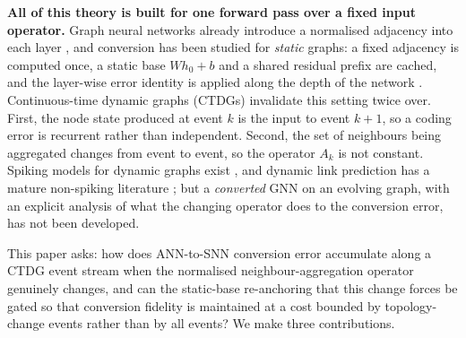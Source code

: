 \documentclass[preprint,12pt]{elsarticle}
\begin{document}
\textbf{All of this theory is built for one forward pass over a fixed input operator.} Graph neural networks already introduce a normalised adjacency into each layer \cite{kipf2017gcn,hamilton2017graphsage,velickovic2018gat}, and conversion has been studied for \emph{static} graphs: a fixed adjacency is computed once, a static base $Wh_0+b$ and a shared residual prefix are cached, and the layer-wise error identity is applied along the depth of the network \cite{rueckauer2017,li2024casc}. Continuous-time dynamic graphs (CTDGs) invalidate this setting twice over. First, the node state produced at event $k$ is the input to event $k+1$, so a coding error is recurrent rather than independent. Second, the set of neighbours being aggregated changes from event to event, so the operator $A_k$ is not constant. Spiking models for dynamic graphs exist \cite{li2023spikenet,yin2024dysign,li2024continuousgnn}, and dynamic link prediction has a mature non-spiking literature \cite{rossi2020tgn,xu2020tgat,yu2023dyglib,poursafaei2022,cong2023graphmixer,huang2023tgb,gao2025hyperevent,zheng2025survey}; but a \emph{converted} GNN on an evolving graph, with an explicit analysis of what the changing operator does to the conversion error, has not been developed.

This paper asks: how does ANN-to-SNN conversion error accumulate along a CTDG event stream when the normalised neighbour-aggregation operator genuinely changes, and can the static-base re-anchoring that this change forces be gated so that conversion fidelity is maintained at a cost bounded by topology-change events rather than by all events? We make three contributions.
\end{document}
